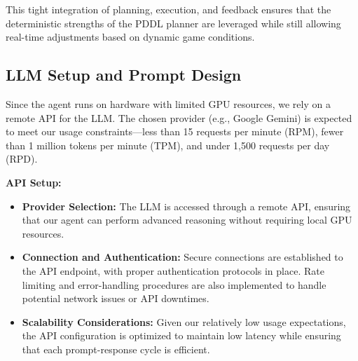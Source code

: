 \documentclass{article}
\begin{document}
This tight integration of planning, execution, and feedback ensures that the deterministic strengths of the PDDL planner are leveraged while still allowing real-time adjustments based on dynamic game conditions.

\subsection{LLM Setup and Prompt Design}

Since the agent runs on hardware with limited GPU resources, we rely on a remote API for the LLM. The chosen provider (e.g., Google Gemini) is expected to meet our usage constraints—less than 15 requests per minute (RPM), fewer than 1 million tokens per minute (TPM), and under 1,500 requests per day (RPD).

\textbf{API Setup:}
\begin{itemize}
    \item \textbf{Provider Selection:}  
    The LLM is accessed through a remote API, ensuring that our agent can perform advanced reasoning without requiring local GPU resources.
    
    \item \textbf{Connection and Authentication:}  
    Secure connections are established to the API endpoint, with proper authentication protocols in place. Rate limiting and error-handling procedures are also implemented to handle potential network issues or API downtimes.
    
    \item \textbf{Scalability Considerations:}  
    Given our relatively low usage expectations, the API configuration is optimized to maintain low latency while ensuring that each prompt-response cycle is efficient.
\end{itemize}
\end{document}
